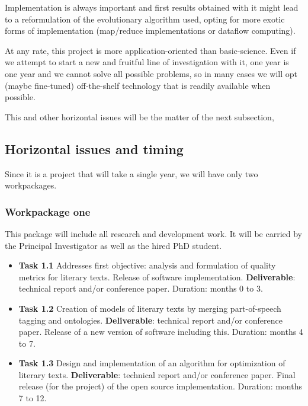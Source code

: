\documentclass[a4paper,12pt,twocolumn]{article}
\begin{document}
Implementation is always important
\cite{DBLP:conf/iwann/MereloRACML11} and first results obtained with
it might lead to a reformulation
of the evolutionary algorithm used, opting for more exotic forms of
implementation (map/reduce implementations or dataflow computing). 

At any rate, this project is more application-oriented than
basic-science. Even if we attempt to start a new and fruitful line of
investigation with it, one year is one year and we cannot solve all
possible problems, so in many cases we will opt (maybe fine-tuned)
off-the-shelf technology that is readily available when possible.

This and other horizontal issues will be the matter of the next
subsection,

\subsection{Horizontal issues and timing}

Since it is a project that will take a single year, we will have only
two workpackages.

\subsubsection{Workpackage one}

This package will include all research and development work. It will
be carried by the Principal Investigator as well as the hired PhD
student.

\begin{itemize}
\item {\bf Task 1.1} Addresses first objective: analysis and formulation of
  quality metrics for literary texts. Release of software implementation.
 {\bf Deliverable}: technical
  report and/or conference paper. Duration: months 0 to 3.
\item {\bf Task 1.2} Creation of models of literary texts by merging
  part-of-speech tagging and ontologies. {\bf Deliverable}: technical
  report and/or conference paper.  Release of a new version of
  software including this. Duration: months 4 to 7. 
\item {\bf Task 1.3} Design and implementation of an algorithm for
  optimization of literary texts. {\bf Deliverable}: technical
  report and/or conference paper. Final release (for the project) of
  the open source implementation.  Duration: months 7 to 12.
\end{itemize}
\end{document}
